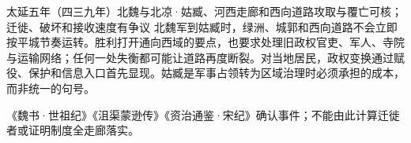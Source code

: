 \begin{event}{}{太延五年（四三九年）}{北魏与北凉·姑臧、河西走廊和西向道路}{攻取与覆亡可核；迁徙、破坏和接收速度有争议}
北魏军到姑臧时，绿洲、城郭和西向道路不会立即按平城节奏运转。胜利打开通向西域的要点，也要求处理旧政权官吏、军人、寺院与运输网络；任何一处失衡都可能让道路再度断裂。对当地居民，政权变换通过赋役、保护和信息入口首先显现。姑臧是军事占领转为区域治理时必须承担的成本，而非统一的句号。

《魏书·世祖纪》《沮渠蒙逊传》《资治通鉴·宋纪》确认事件；不能由此计算迁徙者或证明制度全走廊落实。
\end{event}

